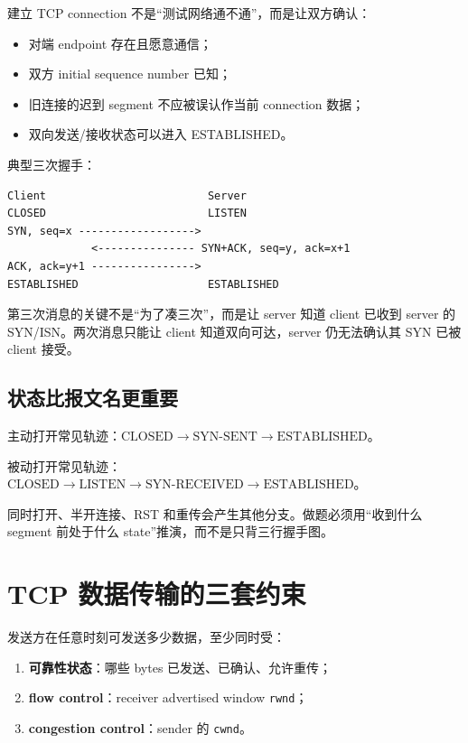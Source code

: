 \documentclass[UTF8,fontset=none,11pt,a4paper]{ctexart}
\providecommand{\tightlist}{\setlength{\itemsep}{0pt}\setlength{\parskip}{0pt}}
\providecommand{\passthrough}[1]{#1}
\begin{document}
建立 TCP connection 不是``测试网络通不通''，而是让双方确认：

\begin{itemize}
\tightlist
\item
  对端 endpoint 存在且愿意通信；
\item
  双方 initial sequence number 已知；
\item
  旧连接的迟到 segment 不应被误认作当前 connection 数据；
\item
  双向发送/接收状态可以进入 ESTABLISHED。
\end{itemize}

典型三次握手：

\begin{lstlisting}
Client                         Server
CLOSED                         LISTEN
SYN, seq=x ------------------>
             <--------------- SYN+ACK, seq=y, ack=x+1
ACK, ack=y+1 ---------------->
ESTABLISHED                    ESTABLISHED
\end{lstlisting}

第三次消息的关键不是``为了凑三次''，而是让 server 知道 client 已收到
server 的 SYN/ISN。两次消息只能让 client 知道双向可达，server
仍无法确认其 SYN 已被 client 接受。

\subsection{状态比报文名更重要}\label{51-ux72b6ux6001ux6bd4ux62a5ux6587ux540dux66f4ux91cdux8981}

主动打开常见轨迹：\(\text{CLOSED} \rightarrow \text{SYN-SENT} \rightarrow \text{ESTABLISHED}\)。

被动打开常见轨迹：\(\text{CLOSED} \rightarrow \text{LISTEN} \rightarrow \text{SYN-RECEIVED} \rightarrow \text{ESTABLISHED}\)。

同时打开、半开连接、RST 和重传会产生其他分支。做题必须用``收到什么
segment 前处于什么 state''推演，而不是只背三行握手图。

\section{TCP
数据传输的三套约束}\label{6-tcp-ux6570ux636eux4f20ux8f93ux7684ux4e09ux5957ux7ea6ux675f}

发送方在任意时刻可发送多少数据，至少同时受：

\begin{enumerate}
\def\labelenumi{\arabic{enumi}.}
\tightlist
\item
  \textbf{可靠性状态}：哪些 bytes 已发送、已确认、允许重传；
\item
  \textbf{flow control}：receiver advertised window
  \passthrough{\lstinline!rwnd!}；
\item
  \textbf{congestion control}：sender 的
  \passthrough{\lstinline!cwnd!}。
\end{enumerate}
\end{document}
